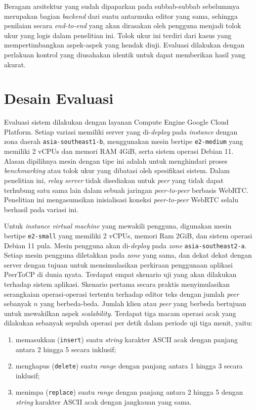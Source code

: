 Beragam arsitektur yang sudah dipaparkan pada subbab-subbab sebelummya merupakan bagian \textit{backend} dari suatu antarmuka editor yang sama, sehingga penilaian secara \textit{end-to-end} yang akan dirasakan oleh pengguna menjadi tolok ukur yang logis dalam penelitian ini. Tolok ukur ini terdiri dari kasus yang mempertimbangkan aspek-aspek yang hendak diuji. Evaluasi dilakukan dengan perlakuan kontrol yang diusahakan identik untuk dapat memberikan hasil yang akurat.

\section{Desain Evaluasi}
\label{sec:desain_evaluasi}

Evaluasi sistem dilakukan dengan layanan Compute Engine Google Cloud Platform. Setiap variasi memiliki server yang di-\textit{deploy} pada \textit{instance} dengan zona daerah \texttt{asia-southeast1-b}, menggunakan mesin bertipe \texttt{e2-medium} yang memiliki 2 vCPUs dan memori RAM 4GiB, serta sistem operasi Debian 11. Alasan dipilihnya mesin dengan tipe ini adalah untuk menghindari proses \textit{benchmarking} atau tolok ukur yang dibatasi oleh spesifikasi sistem. Dalam penelitian ini, \textit{relay server} tidak disediakan untuk \textit{peer} yang tidak dapat terhubung satu sama lain dalam sebuah jaringan \textit{peer-to-peer} berbasis WebRTC. Penelitian ini mengasumsikan inisialisasi koneksi \textit{peer-to-peer} WebRTC selalu berhasil pada variasi ini.

Untuk \textit{instance virtual machine} yang mewakili pengguna, digunakan mesin bertipe \texttt{e2-small} yang memiliki 2 vCPUs, memori Ram 2GiB, dan sistem operasi Debian 11 pula. Mesin pengguna akan di-\textit{deploy} pada \textit{zone} \texttt{asia-southeast2-a}. Setiap mesin pengguna diletakkan pada \textit{zone} yang sama, dan dekat dekat dengan server dengan tujuan untuk mensimulasikan perkiraan penggunaan aplikasi PeerToCP di dunia nyata. Terdapat empat skenario uji yang akan dilakukan terhadap sistem aplikasi. Skenario pertama secara praktis menyimulasikan serangkaian operasi-operasi tertentu terhadap editor teks dengan jumlah \textit{peer} sebanyak $n$ yang berbeda-beda. Jumlah klien atau \textit{peer} yang berbeda bertujuan untuk mewakilkan aspek \textit{scalability}. Terdapat tiga macam operasi acak yang dilakukan sebanyak sepuluh operasi per detik dalam periode uji tiga menit, yaitu:

\begin{enumerate}[nolistsep]
    \item memasukkan (\texttt{insert}) suatu \textit{string} karakter ASCII acak dengan panjang antara 2 hingga 5 secara inklusif;
    \item menghapus (\texttt{delete}) suatu \textit{range} dengan panjang antara 1 hingga 3 secara inklusif;
    \item menimpa (\texttt{replace}) suatu \textit{range} dengan panjang antara 2 hingga 5 dengan \textit{string} karakter ASCII acak dengan jangkauan yang sama.
\end{enumerate}

